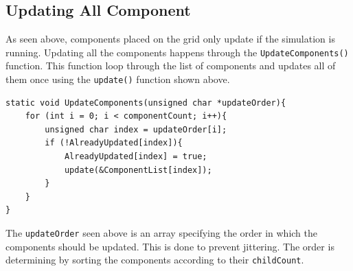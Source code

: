 \documentclass[report]{subfiles}
\begin{document}
\subsection{Updating All Component}
As seen above, components placed on the grid only update if the simulation is running. Updating all the components happens through the \texttt{UpdateComponents()} function.
This function loop through the list of components and updates all of them once using the \texttt{update()} function shown above.
\begin{lstlisting}
static void UpdateComponents(unsigned char *updateOrder){
    for (int i = 0; i < componentCount; i++){
        unsigned char index = updateOrder[i];
        if (!AlreadyUpdated[index]){
            AlreadyUpdated[index] = true;
            update(&ComponentList[index]);
        }
    }
}
\end{lstlisting}
The \texttt{updateOrder} seen above is an array specifying the order in which the components should be updated. This is done to prevent jittering. The order is determining by sorting the components according to their \texttt{childCount}.
\end{document}
